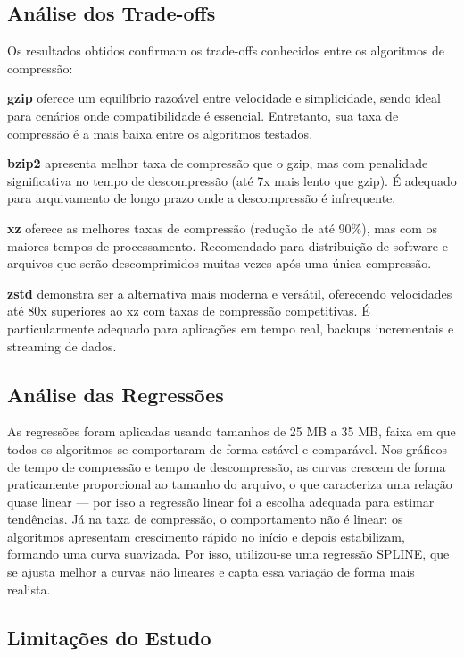 \documentclass[acmsmall]{acmart}
\begin{document}
\subsection{Análise dos Trade-offs}

Os resultados obtidos confirmam os trade-offs conhecidos entre os algoritmos de compressão:

\textbf{gzip} oferece um equilíbrio razoável entre velocidade e simplicidade, sendo ideal para cenários onde compatibilidade é essencial. Entretanto, sua taxa de compressão é a mais baixa entre os algoritmos testados.

\textbf{bzip2} apresenta melhor taxa de compressão que o gzip, mas com penalidade significativa no tempo de descompressão (até 7x mais lento que gzip). É adequado para arquivamento de longo prazo onde a descompressão é infrequente.

\textbf{xz} oferece as melhores taxas de compressão (redução de até 90\%), mas com os maiores tempos de processamento. Recomendado para distribuição de software e arquivos que serão descomprimidos muitas vezes após uma única compressão.

\textbf{zstd} demonstra ser a alternativa mais moderna e versátil, oferecendo velocidades até 80x superiores ao xz com taxas de compressão competitivas. É particularmente adequado para aplicações em tempo real, backups incrementais e streaming de dados.

\subsection{Análise das Regressões}

As regressões foram aplicadas usando tamanhos de 25 MB a 35 MB, faixa em que todos os algoritmos se comportaram de forma estável e comparável. Nos gráficos de tempo de compressão e tempo de descompressão, as curvas crescem de forma praticamente proporcional ao tamanho do arquivo, o que caracteriza uma relação quase linear --- por isso a regressão linear foi a escolha adequada para estimar tendências. Já na taxa de compressão, o comportamento não é linear: os algoritmos apresentam crescimento rápido no início e depois estabilizam, formando uma curva suavizada. Por isso, utilizou-se uma regressão SPLINE, que se ajusta melhor a curvas não lineares e capta essa variação de forma mais realista.

\subsection{Limitações do Estudo}
\end{document}

